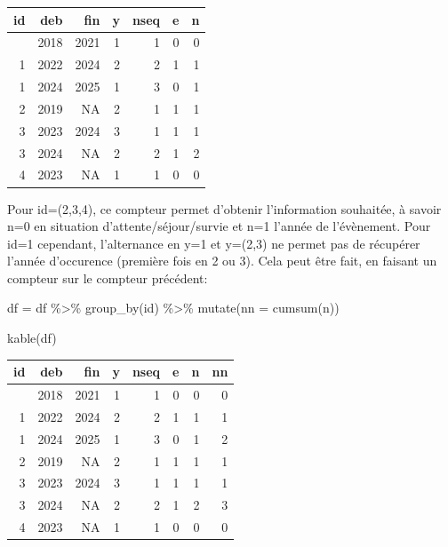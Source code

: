 \documentclass[
  12pt,
  letterpaper,
  DIV=11,
  numbers=noendperiod,
  onepage,
  openany]{scrreprt}
\newenvironment{Shaded}{\begin{snugshade}}{\end{snugshade}}
\newcommand{\AttributeTok}[1]{\textcolor[rgb]{0.80,0.80,0.80}{#1}}
\newcommand{\FunctionTok}[1]{\textcolor[rgb]{0.94,0.94,0.56}{#1}}
\newcommand{\NormalTok}[1]{\textcolor[rgb]{0.80,0.80,0.80}{#1}}
\newcommand{\OtherTok}[1]{\textcolor[rgb]{0.94,0.94,0.56}{#1}}
\newcommand{\SpecialCharTok}[1]{\textcolor[rgb]{0.86,0.64,0.64}{#1}}
\begin{document}
\begin{longtable}[]{@{}rrrrrrr@{}}
\toprule\noalign{}
id & deb & fin & y & nseq & e & n \\
\midrule\noalign{}
\endhead
\bottomrule\noalign{}
\endlastfoot
1 & 2018 & 2021 & 1 & 1 & 0 & 0 \\
1 & 2022 & 2024 & 2 & 2 & 1 & 1 \\
1 & 2024 & 2025 & 1 & 3 & 0 & 1 \\
2 & 2019 & NA & 2 & 1 & 1 & 1 \\
3 & 2023 & 2024 & 3 & 1 & 1 & 1 \\
3 & 2024 & NA & 2 & 2 & 1 & 2 \\
4 & 2023 & NA & 1 & 1 & 0 & 0 \\
\end{longtable}

Pour id=(2,3,4), ce compteur permet d'obtenir l'information souhaitée, à
savoir n=0 en situation d'attente/séjour/survie et n=1 l'année de
l'évènement. Pour id=1 cependant, l'alternance en y=1 et y=(2,3) ne
permet pas de récupérer l'année d'occurence (première fois en 2 ou 3).
Cela peut être fait, en faisant un compteur sur le compteur précédent:

\begin{Shaded}
\begin{Highlighting}[]
\NormalTok{df }\OtherTok{=}\NormalTok{ df }\SpecialCharTok{\%\textgreater{}\%} \FunctionTok{group\_by}\NormalTok{(id) }\SpecialCharTok{\%\textgreater{}\%} \FunctionTok{mutate}\NormalTok{(}\AttributeTok{nn  =} \FunctionTok{cumsum}\NormalTok{(n)) }

\FunctionTok{kable}\NormalTok{(df)}
\end{Highlighting}
\end{Shaded}

\begin{longtable}[]{@{}rrrrrrrr@{}}
\toprule\noalign{}
id & deb & fin & y & nseq & e & n & nn \\
\midrule\noalign{}
\endhead
\bottomrule\noalign{}
\endlastfoot
1 & 2018 & 2021 & 1 & 1 & 0 & 0 & 0 \\
1 & 2022 & 2024 & 2 & 2 & 1 & 1 & 1 \\
1 & 2024 & 2025 & 1 & 3 & 0 & 1 & 2 \\
2 & 2019 & NA & 2 & 1 & 1 & 1 & 1 \\
3 & 2023 & 2024 & 3 & 1 & 1 & 1 & 1 \\
3 & 2024 & NA & 2 & 2 & 1 & 2 & 3 \\
4 & 2023 & NA & 1 & 1 & 0 & 0 & 0 \\
\end{longtable}
\end{document}
